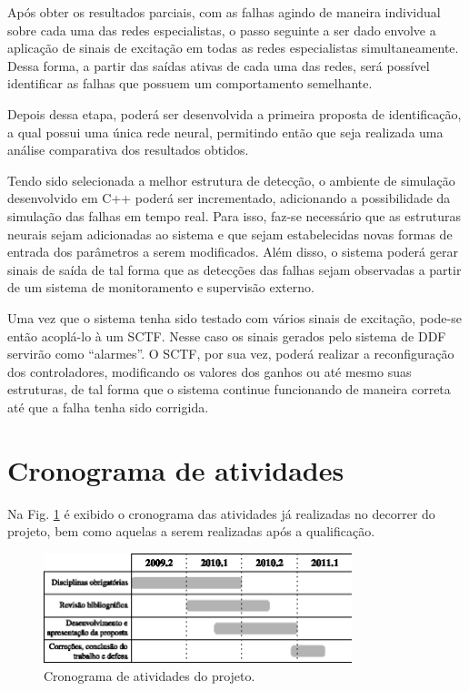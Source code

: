 Após obter os resultados parciais, com as falhas agindo de maneira individual
sobre cada uma das redes especialistas, o passo seguinte a ser dado envolve a
aplicação de sinais de excitação em todas as redes especialistas
simultaneamente. Dessa forma, a partir das saídas ativas de cada uma das redes,
será possível identificar as falhas que possuem um comportamento semelhante.

Depois dessa etapa, poderá ser desenvolvida a primeira proposta de
identificação, a qual possui uma única rede neural, permitindo então que seja
realizada uma análise comparativa dos resultados obtidos.

Tendo sido selecionada a melhor estrutura de detecção, o ambiente de simulação
desenvolvido em C++ poderá ser incrementado, adicionando a possibilidade da
simulação das falhas em tempo real. Para isso, faz-se necessário que as
estruturas neurais sejam adicionadas ao sistema e que sejam estabelecidas novas
formas de entrada dos parâmetros a serem modificados. Além disso, o sistema
poderá gerar sinais de saída de tal forma que as detecções das falhas sejam
observadas a partir de um sistema de monitoramento e supervisão externo. 

Uma vez que o sistema tenha sido testado com vários sinais de excitação, pode-se
então acoplá-lo à um SCTF. Nesse caso os sinais gerados pelo sistema de DDF
servirão como ``alarmes''. O SCTF, por sua vez, poderá realizar a reconfiguração
dos controladores, modificando os valores dos ganhos ou até mesmo suas
estruturas, de tal forma que o sistema continue funcionando de maneira correta
até que a falha tenha sido corrigida.

\section{Cronograma de atividades}
Na Fig. \ref{fig:cronograma} é exibido o cronograma das atividades já realizadas
no decorrer do projeto, bem como aquelas a serem realizadas após a qualificação.

\begin{figure}[htb]
\centering
    \includegraphics[width=0.8\textwidth]{imgs/conclusoes/eps/cronograma}
    \caption{Cronograma de atividades do projeto.}
    \label{fig:cronograma}
\end{figure}
